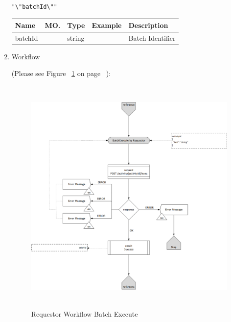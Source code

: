 \begin{enumerate}
\begin{tcolorbox}[boxrule=0pt, frame empty]
\begin{verbatim}
"\"batchId\""

\end{verbatim}
\end{tcolorbox}

\begin{table}[H]
\footnotesize

\begin{center}
\begin{tabular}{|p{3cm}|l|p{3cm}|p{3cm}|p{4cm}|} 
\hline
\rowcolor{lightgray}	Name	& MO.	& Type	& Example & 	Description \\
\hline

batchId				&	&	string				&			&	Batch Identifier \\
\hline   

\end{tabular}
\end{center}
\end{table}

\item Workflow

(Please see Figure ~\ref{fig:RBE} on page ~\pageref{fig:RBE}):

\begin{figure}[H]
    \centering
    \includegraphics[width=12cm,height=12cm,angle=0]{./diag/Workflow/Activity/BatchExecute-R-Workflow.png}
    \caption{Requestor Workflow Batch Execute }
	\label{fig:RBE}
\end{figure}


\end{enumerate}

